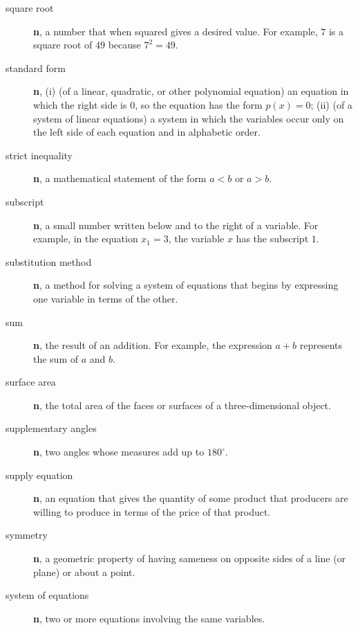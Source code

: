 \documentclass[10pt,]{book}
\newcommand{\terminology}[1]{\textbf{#1}}
\theoremstyle{plain}
\theoremstyle{definition}
\theoremstyle{definition}
\theoremstyle{definition}
\numberwithin{equation}{part}
\newcommand\degree[0]{^{\circ}}
\newcommand{\lt}{<}
\newcommand{\gt}{>}
\begin{document}
\begin{description}
\item[{square root}]\hypertarget{li-810}{}\terminology{n}, a number that when squared gives a desired value. For example, \(7\) is a square root of \(49\) because \(7^2 = 49\).%
\item[{standard form}]\hypertarget{li-811}{}\terminology{n}, (i) (of a linear, quadratic, or other polynomial equation) an equation in which the right side is 0, so the equation has the form \(p(x) = 0\); (ii) (of a system of linear equations) a system in which the variables occur only on the left side of each equation and in alphabetic order.%
\item[{strict inequality}]\hypertarget{li-812}{}\terminology{n}, a mathematical statement of the form \(a \lt b\) or \(a \gt b\).%
\item[{subscript}]\hypertarget{li-813}{}\terminology{n}, a small number written below and to the right of a variable. For example, in the equation \(x_1 = 3\), the variable \(x\) has the subscript \(1\).%
\item[{substitution method}]\hypertarget{li-814}{}\terminology{n}, a method for solving a system of equations that begins by expressing one variable in terms of the other.%
\item[{sum}]\hypertarget{li-815}{}\terminology{n}, the result of an addition. For example, the expression \(a + b\) represents the sum of \(a\) and \(b\).%
\item[{surface area}]\hypertarget{li-816}{}\terminology{n}, the total area of the faces or surfaces of a three-dimensional object.%
\item[{supplementary angles}]\hypertarget{li-817}{}\terminology{n}, two angles whose measures add up to \(180\degree\).%
\item[{supply equation}]\hypertarget{li-818}{}\terminology{n}, an equation that gives the quantity of some product that producers are willing to produce in terms of the price of that product.%
\item[{symmetry}]\hypertarget{li-819}{}\terminology{n}, a geometric property of having sameness on opposite sides of a line (or plane) or about a point.%
\item[{system of equations}]\hypertarget{li-820}{}\terminology{n}, two or more equations involving the same variables.%
\end{description}
%
\typeout{************************************************}
\typeout{************************************************}
\end{document}
